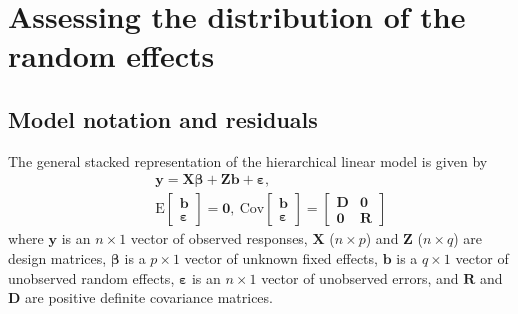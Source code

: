 \documentclass[12pt]{article} %
\newcommand{\E}{\ensuremath{\mathrm{E}}}
\newcommand{\cov}{\ensuremath{\mathrm{Cov}}}
\begin{document}
\section{Assessing the distribution of the random effects}\label{sec:methods}


\subsection{Model notation and residuals}\label{sec:resid}
\noindent
The general stacked representation of the hierarchical linear model is given by
%
\begin{eqnarray}\label{eq:hlm}
 && \bm{y} = \bm{X \beta} + \bm{Z b} + \bm{\varepsilon}, \\ \nonumber
 && \E \begin{bmatrix} \bm{b} \\ \bm{\varepsilon} \end{bmatrix} = \bm{0}, 
 \ \cov \begin{bmatrix} \bm{b} \\ \bm{\varepsilon} \end{bmatrix} = 
  	\begin{bmatrix} \bm{D} & \bm{0}\\ \bm{0} & \bm{R} \end{bmatrix}
\end{eqnarray}
%
where $\bm{y}$ is an $n \times 1$ vector of observed responses, $\bm{X}$ ($n \times p$) and $\bm{Z}$ ($n \times q$) are design matrices, $\bm{\beta}$ is a $p \times 1$ vector of unknown fixed effects, $\bm{b}$ is a $q \times 1$ vector of unobserved random effects, $\bm{\varepsilon}$ is an $n \times 1$ vector of unobserved errors, and $\bm{R}$ and $\bm{D}$ are positive definite covariance matrices.
\end{document}
